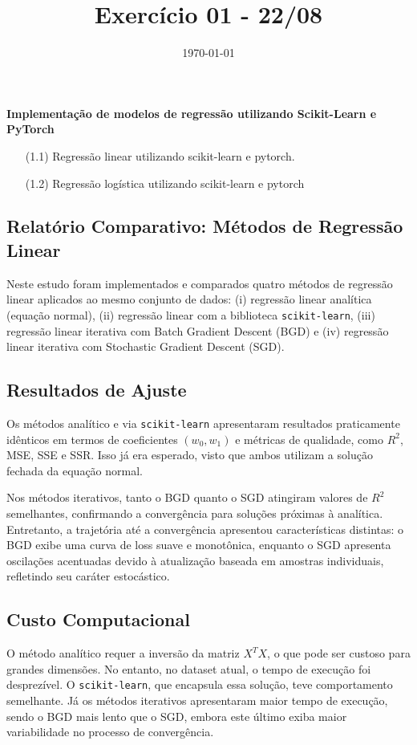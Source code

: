 \documentclass[a4paper]{article}
\date{\today}
\title{Exercício 01 - 22/08}
\begin{document}
    \header{}

\textbf{Implementação de modelos de regressão utilizando Scikit-Learn e PyTorch}
\begin{center}
\begin{itemize}
  \item[(1.1)] Regressão linear utilizando scikit-learn e pytorch.
  \item[(1.2)] Regressão logística utilizando scikit-learn e pytorch
\end{itemize}
\end{center}

    \begin{answer}[Ítem 1.1]
\section*{Relatório Comparativo: Métodos de Regressão Linear}

Neste estudo foram implementados e comparados quatro métodos de regressão linear aplicados ao mesmo conjunto de dados: (i) regressão linear analítica (equação normal), (ii) regressão linear com a biblioteca \texttt{scikit-learn}, (iii) regressão linear iterativa com Batch Gradient Descent (BGD) e (iv) regressão linear iterativa com Stochastic Gradient Descent (SGD). 

\subsection*{Resultados de Ajuste}
Os métodos analítico e via \texttt{scikit-learn} apresentaram resultados praticamente idênticos em termos de coeficientes $(w_0, w_1)$ e métricas de qualidade, como $R^2$, MSE, SSE e SSR. Isso já era esperado, visto que ambos utilizam a solução fechada da equação normal. 

Nos métodos iterativos, tanto o BGD quanto o SGD atingiram valores de $R^2$ semelhantes, confirmando a convergência para soluções próximas à analítica. Entretanto, a trajetória até a convergência apresentou características distintas: o BGD exibe uma curva de loss suave e monotônica, enquanto o SGD apresenta oscilações acentuadas devido à atualização baseada em amostras individuais, refletindo seu caráter estocástico.

\subsection*{Custo Computacional}
O método analítico requer a inversão da matriz $X^T X$, o que pode ser custoso para grandes dimensões. No entanto, no dataset atual, o tempo de execução foi desprezível. O \texttt{scikit-learn}, que encapsula essa solução, teve comportamento semelhante. Já os métodos iterativos apresentaram maior tempo de execução, sendo o BGD mais lento que o SGD, embora este último exiba maior variabilidade no processo de convergência.


\end{answer}
\end{document}
